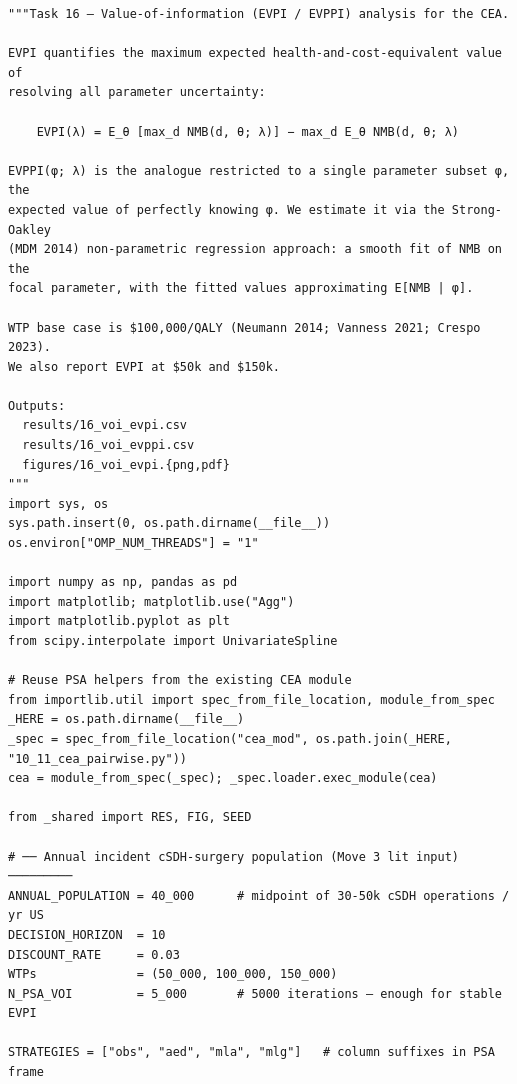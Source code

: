 \documentclass[11pt,a4paper]{article}
\begin{document}
\begin{lstlisting}[style=codeblock]
"""Task 16 — Value-of-information (EVPI / EVPPI) analysis for the CEA.

EVPI quantifies the maximum expected health-and-cost-equivalent value of
resolving all parameter uncertainty:

    EVPI(λ) = E_θ [max_d NMB(d, θ; λ)] − max_d E_θ NMB(d, θ; λ)

EVPPI(φ; λ) is the analogue restricted to a single parameter subset φ, the
expected value of perfectly knowing φ. We estimate it via the Strong-Oakley
(MDM 2014) non-parametric regression approach: a smooth fit of NMB on the
focal parameter, with the fitted values approximating E[NMB | φ].

WTP base case is $100,000/QALY (Neumann 2014; Vanness 2021; Crespo 2023).
We also report EVPI at $50k and $150k.

Outputs:
  results/16_voi_evpi.csv
  results/16_voi_evppi.csv
  figures/16_voi_evpi.{png,pdf}
"""
import sys, os
sys.path.insert(0, os.path.dirname(__file__))
os.environ["OMP_NUM_THREADS"] = "1"

import numpy as np, pandas as pd
import matplotlib; matplotlib.use("Agg")
import matplotlib.pyplot as plt
from scipy.interpolate import UnivariateSpline

# Reuse PSA helpers from the existing CEA module
from importlib.util import spec_from_file_location, module_from_spec
_HERE = os.path.dirname(__file__)
_spec = spec_from_file_location("cea_mod", os.path.join(_HERE, "10_11_cea_pairwise.py"))
cea = module_from_spec(_spec); _spec.loader.exec_module(cea)

from _shared import RES, FIG, SEED

# ── Annual incident cSDH-surgery population (Move 3 lit input) ─────────
ANNUAL_POPULATION = 40_000      # midpoint of 30-50k cSDH operations / yr US
DECISION_HORIZON  = 10
DISCOUNT_RATE     = 0.03
WTPs              = (50_000, 100_000, 150_000)
N_PSA_VOI         = 5_000       # 5000 iterations — enough for stable EVPI

STRATEGIES = ["obs", "aed", "mla", "mlg"]   # column suffixes in PSA frame



\end{lstlisting}
\end{document}

